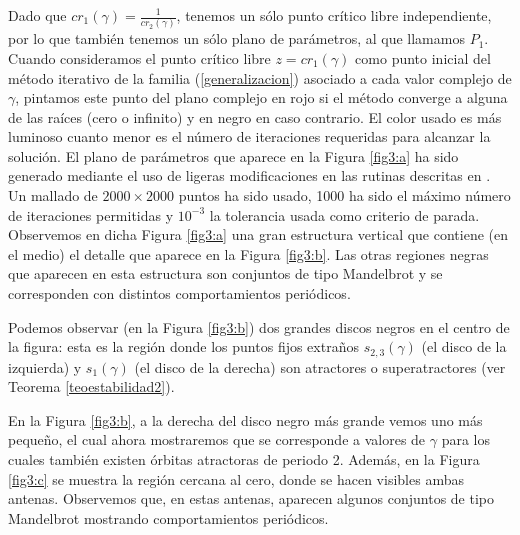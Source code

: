 Dado que $cr_1(\gamma)=\frac{1}{cr_2(\gamma)}$, tenemos un sólo punto crítico libre independiente, por lo que también tenemos un sólo plano de parámetros, al que llamamos $P_1$. Cuando consideramos el punto crítico libre $z=cr_1(\gamma)$ como punto inicial del método iterativo de la familia (\ref{generalizacion}) asociado a cada valor complejo de $\gamma$, pintamos este punto del plano complejo en rojo si el método converge a alguna de las raíces (cero o infinito) y en negro en caso contrario. El color usado es más luminoso cuanto menor es el número de iteraciones requeridas para alcanzar la solución. El plano de parámetros que aparece en la Figura \ref{fig3:a} ha sido generado mediante el uso de ligeras modificaciones en las rutinas descritas en \cite{CCT}. Un mallado de $2000\times 2000$ puntos ha sido usado, 1000 ha sido el máximo número de iteraciones permitidas y $10^{-3}$ la tolerancia usada como criterio de parada. Observemos en dicha Figura \ref{fig3:a}  una gran estructura vertical que contiene (en el medio) el detalle que aparece en la Figura \ref{fig3:b}. Las otras regiones negras que aparecen en esta estructura son conjuntos de tipo Mandelbrot y se corresponden con distintos comportamientos periódicos.


Podemos observar (en la Figura \ref{fig3:b}) dos grandes discos negros en el centro de la figura: esta es la región donde los puntos fijos extraños $s_{2,3}(\gamma)$ (el disco de la izquierda) y $s_1(\gamma)$ (el disco de la derecha) son atractores o superatractores (ver Teorema \ref{teoestabilidad2}). 

En la Figura \ref{fig3:b}, a la derecha del disco negro más grande vemos uno más pequeño, el cual ahora mostraremos que se corresponde a valores de $\gamma$ para los cuales también existen órbitas atractoras de periodo 2. Además, en la Figura \ref{fig3:c} se muestra la región cercana al cero, donde se hacen visibles ambas antenas. Observemos que, en estas antenas, aparecen algunos conjuntos de tipo Mandelbrot mostrando comportamientos periódicos.

